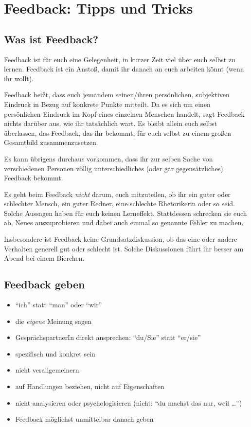 \section{Feedback: Tipps und Tricks}
\subsection{Was ist Feedback?}
Feedback ist für euch eine Gelegenheit, in kurzer Zeit viel über euch selbst zu lernen. Feedback ist ein Anstoß, damit ihr danach an euch arbeiten könnt (wenn ihr wollt).

Feedback heißt, dass euch jemandem seinen/ihren persönlichen, subjektiven Eindruck in Bezug auf konkrete Punkte mitteilt. Da es sich um einen persönlichen Eindruck im Kopf eines einzelnen Menschen handelt, sagt Feedback nichts darüber aus, wie ihr tatsächlich wart. Es bleibt allein euch selbst überlassen, das Feedback, das ihr bekommt, für euch selbst zu einem großen Gesamtbild zusammenzusetzen.

Es kann übrigens durchaus vorkommen, dass ihr zur selben Sache von verschiedenen Personen völlig unterschiedliches (oder gar gegensätzliches) Feedback bekommt.

Es geht beim Feedback \emph{nicht} darum, euch mitzuteilen, ob ihr ein guter oder schlechter Mensch, ein guter Redner, eine schlechte Rhetorikerin oder so seid. Solche Aussagen haben für euch keinen Lerneffekt. Stattdessen schrecken sie euch ab, Neues auszuprobieren und dabei auch einmal so genannte Fehler zu machen.

Insbesondere ist Feedback keine Grundsatzdiskussion, ob das eine oder andere Verhalten generell gut oder schlecht ist. Solche Diskussionen führt ihr besser am Abend bei einem Bierchen.

\subsection{Feedback geben}
\begin{itemize}
  \item  "`ich"' statt "`man"' oder "`wir"'
  \item die \emph{eigene} Meinung sagen
  \item GesprächspartnerIn direkt ansprechen: "`du/Sie"' statt "`er/sie"'
  \item spezifisch und konkret sein
  \item nicht verallgemeinern
  \item auf Handlungen beziehen, nicht auf Eigenschaften
  \item nicht analysieren oder psychologisieren (nicht: "`du machst das nur, weil \ldots"')
  \item Feedback möglichst unmittelbar danach geben
\end{itemize}

